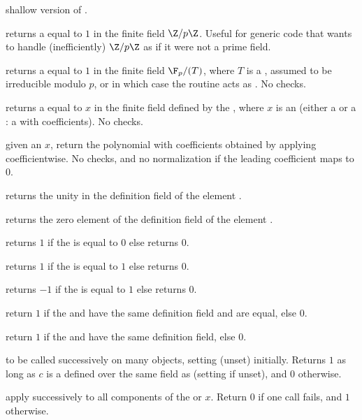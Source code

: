 shallow version of .

 returns a  equal to $1$ in the
finite field $\Z/p\Z$. Useful for generic code that wants to handle
(inefficiently) $\Z/p\Z$ as if it were not a prime field.

 returns a  equal to $1$ in the
finite field $\F_p/(T)$, where $T$ is a , assumed to be irreducible
modulo $p$, or  in which case the routine acts as .
No checks.

 returns a  equal to $x$
in the finite field defined by the  , where
$x$ is an  (either a  or a : a  with
 coefficients). No checks.

 given an  $x$,
return the polynomial with  coefficients obtained by
applying  coefficientwise. No checks, and no normalization
if the leading coefficient maps to $0$.

 returns the unity in the definition field of the
 element .

 returns the zero element of the definition field of
the  element .

 returns $1$ if the   is equal
to $0$ else returns $0$.

 returns $1$ if the   is equal
to $1$ else returns $0$.

 returns $-1$ if the   is equal
to $1$ else returns $0$.

 return $1$ if the   and
 have the same definition field and are equal, else $0$.

 return $1$ if the   and
 have the same definition field, else $0$.

 to be called successively on many objects,
setting  (unset) initially. Returns $1$ as long as $c$ is a
 defined over the same field as  (setting 
if unset), and $0$ otherwise.

 apply  successively to all
components of the  or  $x$. Return $0$ if one call fails,
and $1$ otherwise.

